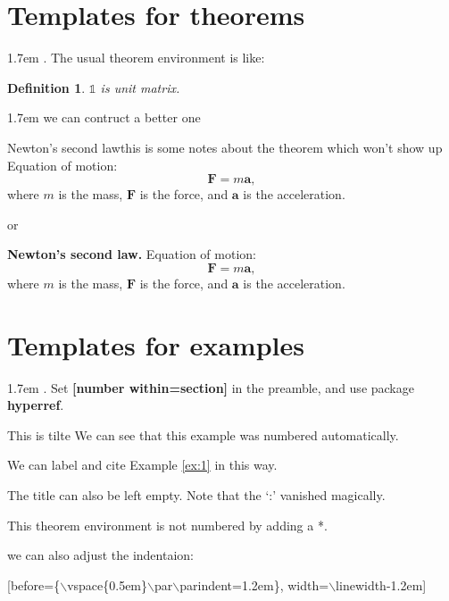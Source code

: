\documentclass{article}
\def\1{\mathbb{1}}
\newcommand{\vv}{\boldsymbol}
\newtheorem{definition}[subsection]{Definition}
\begin{document}
\section{Templates for theorems}
\hangindent 1.7em
. The usual theorem environment is like:
\begin{definition}
    $\1$ is unit matrix.
\end{definition}

\hangindent 1.7em
\indent we can contruct a better one
\begin{theorem}[label=th:2]{Newton's second law}{this is some notes about the theorem which won't show up}
    Equation of motion:
    $$\vv F=m\vv a,$$
    where $m$ is the mass, $\vv F$ is the force, and $\vv a$ is the acceleration.
\end{theorem}
or
\begin{theorem}{1.1}{}
    \textbf{Newton's second law.} Equation of motion:
    $$\vv F=m\vv a,$$
    where $m$ is the mass, $\vv F$ is the force, and $\vv a$ is the acceleration.
\end{theorem}

\section{Templates for examples}
\hangindent 1.7em
. Set \textbf{[number within=section]} in the preamble, and use package \textbf{hyperref}.
\begin{example}[label=ex:1]{This is tilte}{}
    We can see that this example was numbered automatically. 
\end{example}
We can label and cite Example \ref{ex:1} in this way. 
\begin{example}{}{}
    The title can also be left empty. Note that the `:' vanished magically.
\end{example}
\begin{example*}{}{}
    This theorem environment is not numbered by adding a *.
\end{example*}
we can also adjust the indentaion:
\begin{example*}[before={\vspace{0.5em}\par\parindent=1.2em}, width=\linewidth-1.2em]{}{}
    [before=\{$\backslash$vspace\{0.5em\}$\backslash$par$\backslash$parindent=1.2em\}, width=$\backslash$linewidth-1.2em]
\end{example*}
\end{document}
